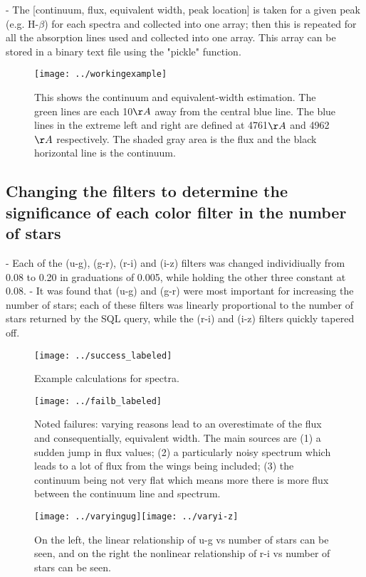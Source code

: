 \documentclass[12pt]{article}
\begin{document}
- The [continuum, flux, equivalent width, peak location] is taken for a given peak (e.g. H-$\beta$) for each spectra and collected into one array; then this is repeated for all the absorption lines used and collected into one array. This array can be stored in a binary text file using the "pickle" function. \\
\begin{figure}
\texttt{[image: ../workingexample]}\\
\caption{This shows the continuum and equivalent-width estimation. The green lines are each 10$\AA$  away from the central blue line. The blue lines in the extreme left and right are defined at 4761$\AA$ and 4962$\AA$  respectively. The shaded gray area is the flux and the black horizontal line is the continuum.}
\end{figure}
\subsection{Changing the filters to determine the significance of each color filter in the number of stars}
- Each of the (u-g), (g-r), (r-i) and (i-z) filters was changed individiually from 0.08 to 0.20 in graduations of 0.005, while holding the other three constant at 0.08. 
- It was found that (u-g) and (g-r) were most important for increasing the number of stars; each of these filters was linearly proportional to the number of stars returned by the SQL query, while the (r-i) and (i-z) filters quickly tapered off. 

\begin{figure}
\texttt{[image: ../success\_labeled]}\\
\caption{Example calculations for spectra.}
\end{figure}

\begin{figure}
\texttt{[image: ../failb\_labeled]}\\
\caption{Noted failures: varying reasons lead to an overestimate of the flux and consequentially, equivalent width. The main sources are (1) a sudden jump in flux values; (2) a particularly noisy spectrum which leads to a lot of flux from the wings being included; (3) the continuum being not very flat which means more there is more flux between the continuum line and spectrum.}
\end{figure}
\begin{figure}
\texttt{[image: ../varyingug]}\texttt{[image: ../varyi-z]}\\
\caption{ On the left, the linear relationship of u-g vs number of stars can be seen, and on the right the nonlinear relationship of r-i vs number of stars can be seen.}
\end{figure}
\end{document}
